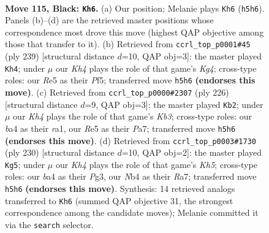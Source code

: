 \documentclass[11pt]{article}
\begin{document}
\clearpage

\begin{figure}[p]\centering
\begin{subfigure}{0.46\textwidth}\centering
\resizebox{\linewidth}{!}{%
\newchessgame
\chessboard[
  setfen={8/8/8/4r1pk/Bn6/6K1/8/8 b - - 15 115},
  showmover=false,
  pgfstyle=straightmove, color=movearrow, markmove={h5-h6}
]}
\caption{}
\end{subfigure}\hfill
\begin{subfigure}{0.46\textwidth}\centering
\resizebox{\linewidth}{!}{%
\newchessgame
\chessboard[
  setfen={8/8/8/4npk1/5p2/8/5K2/3B4 b - - 51 120},
  showmover=false,
  pgfstyle=straightmove, color=movearrow, markmove={g5-h4}
]}
\caption{}
\end{subfigure}
\\[4pt]
\begin{subfigure}{0.46\textwidth}\centering
\resizebox{\linewidth}{!}{%
\newchessgame
\chessboard[
  setfen={8/P6R/8/1k6/8/1KP5/8/r7 w - - 19 114},
  showmover=false,
  pgfstyle=straightmove, color=movearrow, markmove={b3-b2}
]}
\caption{}
\end{subfigure}\hfill
\begin{subfigure}{0.46\textwidth}\centering
\resizebox{\linewidth}{!}{%
\newchessgame
\chessboard[
  setfen={6k1/R7/6P1/7K/8/6P1/8/1r6 w - - 1 116},
  showmover=false,
  pgfstyle=straightmove, color=movearrow, markmove={h5-g5}
]}
\caption{}
\end{subfigure}
\caption{\textbf{Move 115, Black: \texttt{Kh6}.} (a) Our position; Melanie plays \texttt{Kh6} (\texttt{h5h6}). Panels (b)--(d) are the retrieved master positions whose correspondence most drove this move (highest QAP objective among those that transfer to it). (b) Retrieved from \texttt{ccrl\_top\_p0001\#45} (ply 239) [structural distance $d$=10, QAP obj=3]: the master played \texttt{Kh4}; under $\mu$ our \emph{Kh4} plays the role of that game's \emph{Kg4}; cross-type roles: our \emph{R}e5 as their \emph{P}f5; transferred move \texttt{h5h6} \textbf{(endorses this move)}. (c) Retrieved from \texttt{ccrl\_top\_p0000\#2307} (ply 226) [structural distance $d$=9, QAP obj=3]: the master played \texttt{Kb2}; under $\mu$ our \emph{Kh4} plays the role of that game's \emph{Kb3}; cross-type roles: our \emph{b}a4 as their \emph{r}a1, our \emph{R}e5 as their \emph{P}a7; transferred move \texttt{h5h6} \textbf{(endorses this move)}. (d) Retrieved from \texttt{ccrl\_top\_p0003\#1730} (ply 230) [structural distance $d$=10, QAP obj=2]: the master played \texttt{Kg5}; under $\mu$ our \emph{Kh4} plays the role of that game's \emph{Kh5}; cross-type roles: our \emph{b}a4 as their \emph{P}g3, our \emph{N}b4 as their \emph{R}a7; transferred move \texttt{h5h6} \textbf{(endorses this move)}. Synthesis: 14 retrieved analogs transferred to \texttt{Kh6} (summed QAP objective 31, the strongest correspondence among the candidate moves); Melanie committed it via the \texttt{search} selector.}
\label{fig:thought-m229}
\end{figure}
\end{document}
